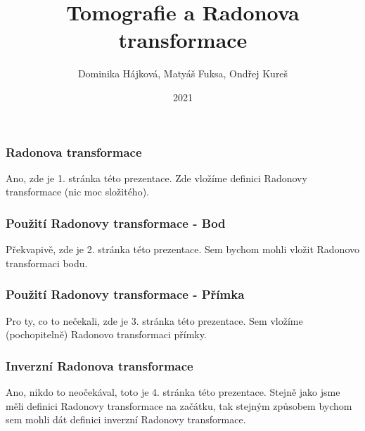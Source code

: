 \documentclass{beamer}
\title{Tomografie a Radonova transformace}
\author{Dominika Hájková, Matyáš Fuksa, Ondřej Kureš}
\institute{Skupina W}
\date{2021}
\begin{document}
\frame{\titlepage}

\begin{frame}
\frametitle{Radonova transformace}
Ano, zde je 1. stránka této prezentace. Zde vložíme definici Radonovy transformace (nic moc složitého).
\end{frame}
\begin{frame}
\frametitle{Použití Radonovy transformace - Bod}
Překvapivě, zde je 2. stránka této prezentace. Sem bychom mohli vložit Radonovo transformaci bodu.
\end{frame}
\begin{frame}
\frametitle{Použití Radonovy transformace - Přímka}
Pro ty, co to nečekali, zde je 3. stránka této prezentace. Sem vložíme (pochopitelně) Radonovo transformaci přímky.
\end{frame}
\begin{frame}
\frametitle{Inverzní Radonova transformace}
Ano, nikdo to neočekával, toto je 4. stránka této prezentace. Stejně jako jsme měli definici Radonovy transformace na začátku, tak stejným způsobem bychom sem mohli dát definici inverzní Radonovy transformace.
\end{frame}
\end{document}

